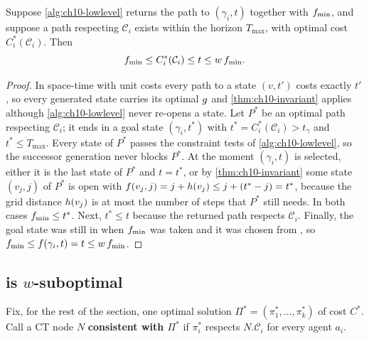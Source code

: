 \begin{lemma}
\label{thm:ch10-lowlevel-lb}
Suppose \cref{alg:ch10-lowlevel} returns the path to $(\gamma_i, t)$
together with $f_{\min}$, and suppose a path respecting $\mathcal{C}_i$
exists within the horizon $T_{\max}$, with optimal cost $C_i^*(\mathcal{C}_i)$.
Then
\[
  f_{\min} \le C_i^*(\mathcal{C}_i) \le t \le w\,f_{\min}.
\]
\end{lemma}
\begin{proof}
In space-time with unit costs every path to a state $(v, t')$ costs exactly
$t'$, so every generated state carries its optimal $g$ and
\cref{thm:ch10-invariant} applies although \cref{alg:ch10-lowlevel} never
re-opens a state. Let $P^*$ be an optimal path respecting $\mathcal{C}_i$;
it ends in a goal state $(\gamma_i, t^*)$ with $t^* = C_i^*(\mathcal{C}_i)
> t_\gamma$ and $t^* \le T_{\max}$. Every state of $P^*$ passes the
constraint tests of \cref{alg:ch10-lowlevel}, so the successor generation
never blocks $P^*$. At the moment $(\gamma_i, t)$ is selected, either it is
the last state of $P^*$ and $t = t^*$, or by \cref{thm:ch10-invariant} some
state $(v_j, j)$ of $P^*$ is open with $f(v_j, j) = j + h(v_j) \le
j + (t^* - j) = t^*$, because the grid distance $h(v_j)$ is at most the
number of steps that $P^*$ still needs. In both cases $f_{\min} \le
t^*$. Next, $t^* \le t$ because the returned path respects $\mathcal{C}_i$.
Finally, the goal state was still in \Open when $f_{\min}$ was taken and
it was chosen from \Focal, so $f_{\min} \le f(\gamma_i, t) = t \le
w\,f_{\min}$.
\end{proof}

\subsection{\ecbs is $w$-suboptimal}

Fix, for the rest of the section, one optimal solution $\Pi^* = (\pi_1^*,
\dots, \pi_k^*)$ of cost $C^*$. Call a CT node $N$ \textbf{consistent with
$\Pi^*$} if
$\pi_i^*$ respects $N.\mathcal{C}_i$ for every agent $a_i$.

